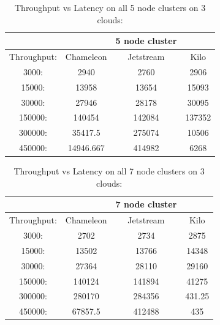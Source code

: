 \documentclass[9pt,twocolumn,twoside]{../../styles/osajnl}
\begin{document}
\begin{table}[!htb]
\centering
\caption{Throughput vs Latency on all 5 node clusters on 3 clouds:}\label{T:bench-5}
\begin{center}
 \begin{tabular}{|c|| c c c|} 
 \hline
  &   &5 node cluster & \\ [0.5ex]
 \hline\hline
 Throughput: & Chameleon & Jetstream & Kilo \\ 
 \hline
 3000: & 2940 & 2760 & 2906 \\
 \hline
 15000: & 13958 & 13654 & 15093 \\
 \hline
 30000: & 27946 & 28178 & 30095 \\
 \hline
 150000: & 140454& 142084 &137352 \\
 \hline
 300000: & 35417.5 & 275074 & 10506 \\
 \hline
 450000: & 14946.667 & 414982 & 6268 \\
 \hline
\end{tabular}
\end{center}
\end{table}

\begin{table}[!htb]
\centering
\caption{Throughput vs Latency on all 7 node clusters on 3 clouds:}\label{T:bench-7}
\begin{center}
 \begin{tabular}{|c|| c c c|} 
 \hline
  &   &7 node cluster & \\ [0.5ex]
 \hline\hline
 Throughput: & Chameleon & Jetstream & Kilo \\ 
 \hline
 3000: & 2702 & 2734 & 2875 \\
 \hline
 15000: & 13502 & 13766 & 14348 \\
 \hline
 30000: & 27364 & 28110 & 29160 \\
 \hline
 150000: & 140124& 141894 &41275 \\
 \hline
 300000: & 280170 & 284356 & 431.25\\
 \hline
 450000: & 67857.5 & 412488 & 435 \\
 \hline
\end{tabular}
\end{center}
\end{table}
\end{document}
